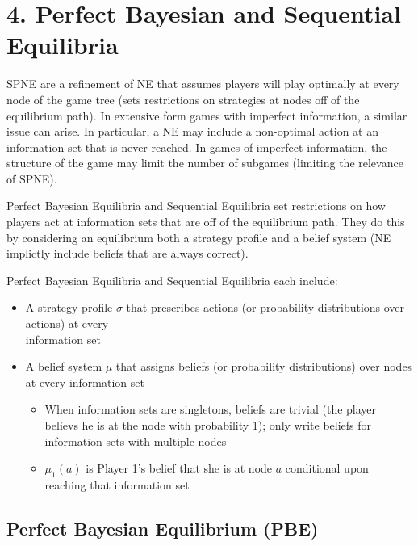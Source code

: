\documentclass{report}
\renewcommand{\chaptermark}[1]{\markboth{#1}{}}
\begin{document}
\bigskip \bigskip

\chapter*{4. Perfect Bayesian and Sequential Equilibria}
\thispagestyle{fancy}
\chaptermark{4. PBE \& SE} \bigskip

SPNE are a refinement of NE that assumes players will play optimally at every node of the game tree (sets restrictions on strategies at nodes off of the equilibrium path). In extensive form games with imperfect information, a similar issue can arise. In particular, a NE may include a non-optimal action at an information set that is never reached. In games of imperfect information, the structure of the game may limit the number of subgames (limiting the relevance of SPNE). \bigskip

Perfect Bayesian Equilibria and Sequential Equilibria set restrictions on how players act at information sets that are off of the equilibrium path. They do this by considering an equilibrium both a strategy profile and a belief system (NE implictly include beliefs that are always correct). \bigskip

Perfect Bayesian Equilibria and Sequential Equilibria each include:
\begin{itemize}
	\item A strategy profile $\sigma$ that prescribes actions (or probability distributions over actions) at every\\ information set
	\item A belief system $\mu$ that assigns beliefs (or probability distributions) over nodes at every information set
		\begin{itemize}
			\item When information sets are singletons, beliefs are trivial (the player believs he is at the node with probability 1); only write beliefs for information sets with multiple nodes
			\item $\mu_1(a)$ is Player 1's belief that she is at node $a$ conditional upon reaching that information set
		\end{itemize}
\end{itemize} \bigskip

\section*{Perfect Bayesian Equilibrium (PBE)}\medskip
\end{document}
